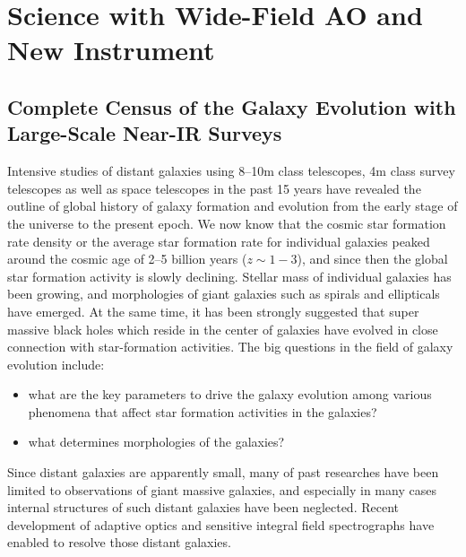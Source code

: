\bigskip



\section{Science with Wide-Field AO and New Instrument}

\subsection{Complete Census of the Galaxy Evolution with Large-Scale
  Near-IR Surveys}

Intensive studies of distant galaxies using 8--10m class telescopes, 
4m class survey telescopes as well as space telescopes in the past 15
years have revealed the outline of global history of galaxy formation
and evolution from the early stage of the universe to the present
epoch. We now know that the cosmic star formation rate density or the
average star formation rate for individual galaxies peaked around the
cosmic age of 2--5 billion years ($z\sim1-3$), and since then the global
star formation activity is slowly declining. Stellar mass of
individual galaxies has been growing, and morphologies of giant
galaxies such as spirals and ellipticals have emerged. At the same time,
it has been strongly suggested that super massive black holes which
reside in the center of galaxies have evolved in close connection with
star-formation activities. 
The big questions in the field of galaxy evolution include:
\begin{itemize}
 \setlength{\itemsep}{-3pt}
 \item what are the key parameters to drive the galaxy evolution among
       various phenomena that affect star formation activities in the
       galaxies?
 \item what determines morphologies of the galaxies?
\end{itemize}
Since distant galaxies are apparently small, many of past researches
have been limited to observations of giant massive galaxies, and
especially in many cases internal structures of such distant galaxies
have been neglected. 
Recent development of adaptive optics and sensitive integral field
spectrographs have enabled to resolve those distant galaxies. 

